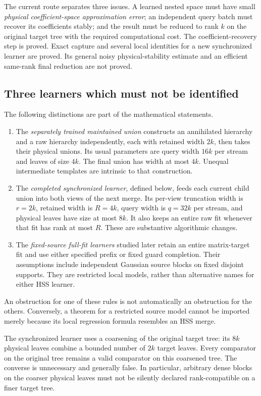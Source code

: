 \documentclass[11pt,oneside,openany,a4paper]{report}
\numberwithin{equation}{chapter}
\theoremstyle{definition}
\theoremstyle{remark}
\begin{document}
The current route separates three issues.  A learned nested space must
have small \emph{physical coefficient-space approximation error}; an
independent query batch must recover its coefficients stably; and the
result must be reduced to rank $k$ on the original target tree with the
required computational cost.  The coefficient-recovery step is proved.
Exact capture and several local identities for a new synchronized learner
are proved.  Its general noisy physical-stability estimate and an
efficient same-rank final reduction are not proved.

\subsection{Three learners which must not be identified}

The following distinctions are part of the mathematical statements.
\begin{enumerate}
 \item The \emph{separately trained maintained union} constructs an
 annihilated hierarchy and a raw hierarchy independently, each with
 retained width $2k$, then takes their physical unions.  Its usual
 parameters are query width $16k$ per stream and leaves of size $4k$.
 The final union has width at most $4k$.  Unequal intermediate templates
 are intrinsic to that construction.
 \item The \emph{completed synchronized learner}, defined below, feeds
 each current child union into both views of the next merge.  Its
 per-view truncation width is $r=2k$, retained width is $R=4k$, query
 width is $q=32k$ per stream, and physical leaves have size at most $8k$.
 It also keeps an entire raw fit whenever that fit has rank at most $R$.
 These are substantive algorithmic changes.
 \item The \emph{fixed-source full-fit learners} studied later retain
 an entire matrix-target fit and use either specified prefix or fixed
 guard completion.  Their assumptions include independent Gaussian
 source blocks on fixed disjoint supports.  They are restricted local
 models, rather than alternative names for either HSS learner.
\end{enumerate}
An obstruction for one of these rules is not automatically an
obstruction for the others.  Conversely, a theorem for a restricted
source model cannot be imported merely because its local regression
formula resembles an HSS merge.

The synchronized learner uses a coarsening of the original target tree:
its $8k$ physical leaves combine a bounded number of $2k$ target leaves.
Every comparator on the original tree remains a valid comparator on
this coarsened tree.  The converse is unnecessary and generally false.
In particular, arbitrary dense blocks on the coarser physical leaves
must not be silently declared rank-compatible on a finer target tree.
\end{document}
